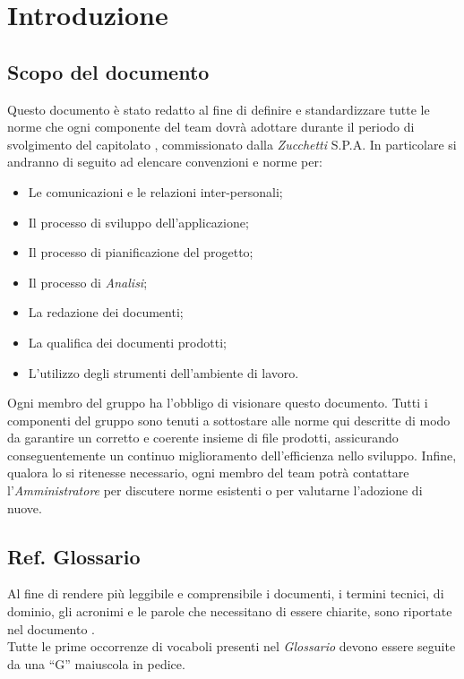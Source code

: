 \section{Introduzione}

\subsection{Scopo del documento}
Questo documento è stato redatto al fine di definire e standardizzare tutte le norme che ogni componente del team \gruppo dovrà adottare durante il periodo di svolgimento del capitolato \progetto, commissionato dalla \textit{Zucchetti} S.P.A. In particolare si andranno di seguito ad elencare convenzioni e norme per:
\begin{itemize}
\item Le comunicazioni e le relazioni inter-personali;
\item Il processo di sviluppo dell'applicazione;
\item Il processo di pianificazione del progetto;
\item Il processo di \textit{Analisi};
\item La redazione dei documenti;
\item La qualifica dei documenti prodotti;
\item L'utilizzo degli strumenti dell'ambiente di lavoro.
\end{itemize}

Ogni membro del gruppo \gruppo ha l'obbligo di visionare questo documento.
Tutti i componenti del gruppo sono tenuti a sottostare alle norme qui descritte di modo da garantire un corretto e coerente insieme di file prodotti, assicurando conseguentemente un continuo miglioramento dell'efficienza nello sviluppo.
Infine, qualora lo si ritenesse necessario, ogni membro del team potrà contattare l'\textit{Amministratore} per discutere norme esistenti o per valutarne l'adozione di nuove.

\subsection{Ref. Glossario}
Al fine di rendere più leggibile e comprensibile i documenti, i termini tecnici, di dominio, gli acronimi e le parole che necessitano di essere chiarite, sono riportate nel documento \Glossario{}.\\
Tutte le prime occorrenze di vocaboli presenti nel \textit{Glossario} devono essere seguite da una ``G'' maiuscola in pedice.
